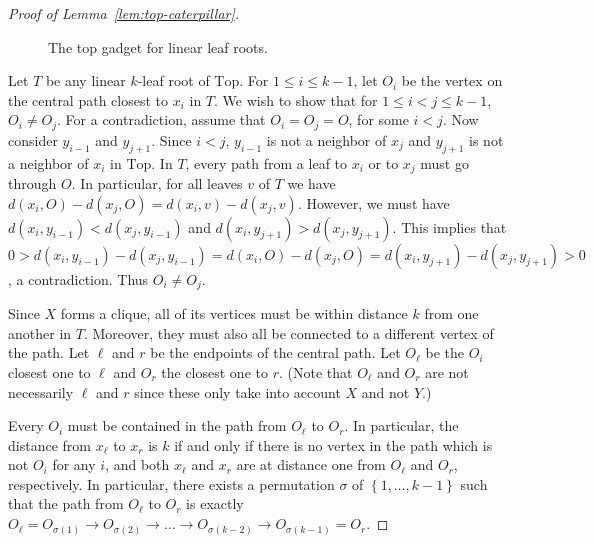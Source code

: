 \documentclass[11pt,letter]{article}
\theoremstyle{remark}
\newcommand{\T}{\text{Top}}
\newcommand{\set}[1]{\left\{#1\right\}}
\begin{document}
\begin{proof}[Proof of Lemma~\ref{lem:top-caterpillar}]
\begin{figure}[h!]
        \caption{The top gadget for linear leaf roots.}\label{fig:linear-top}
    \end{figure}

    Let $T$ be any linear $k$-leaf root of $\T$.
    For $1\leq i\leq k-1$, let $O_i$ be the vertex on the central path closest to $x_i$ in $T$. We wish to show that 
    for $1\leq i<j\leq k-1$, $O_i\neq O_j$. For a contradiction, assume that $O_i=O_j=O$, for some $i<j$. Now consider $y_{i-1}$ and $y_{j+1}$.  Since $i<j$, $y_{i-1}$ is not a neighbor of $x_j$ and $y_{j+1}$ is not a neighbor of $x_i$ in $\T$. In $T$, every path from a leaf to $x_i$ or to $x_j$ must go through $O$. In particular, for all leaves $v$ of $T$ we have $d(x_i,O)-d(x_j,O)=d(x_i,v)-d(x_j,v)$. However, we must have $d(x_i,y_{i-1})<d(x_j,y_{i-1})$ and $d(x_i,y_{j+1})>d(x_j,y_{j+1})$. This implies that $0>d(x_i,y_{i-1})-d(x_j,y_{i-1})=d(x_i,O)-d(x_j,O)=d(x_i,y_{j+1})-d(x_j,y_{j+1})>0$, a contradiction. Thus $O_i\neq O_j$.

    Since $X$ forms a clique, all of its vertices must be within distance $k$ from one another in $T$. Moreover, they must also all be connected to a different vertex of the path. Let $\ell$ and $r$ be the endpoints of the central path. Let $O_\ell$ be the $O_i$ closest one to $\ell$ and $O_r$ the closest one to $r$. (Note that $O_\ell$ and $O_r$ are not necessarily $\ell$ and $r$ since these only take into account $X$ and not $Y$.) 
    
    Every $O_i$ must be contained in the path from $O_\ell$ to $O_r$. In particular, the distance from $x_\ell$ to $x_r$ is $k$ if and only if there is no vertex in the path which is not $O_i$ for any $i$, and both $x_\ell$ and $x_r$ are at distance one from $O_\ell$ and $O_r$, respectively. In particular, there exists a permutation $\sigma$ of $\set{1,\dots,k-1}$ such that the path from $O_\ell$ to $O_r$ is exactly $O_\ell=O_{\sigma(1)}\rightarrow O_{\sigma(2)}\rightarrow \dots\rightarrow O_{\sigma(k-2)}\rightarrow O_{\sigma(k-1)}=O_r$.
    

\end{proof}
\end{document}
